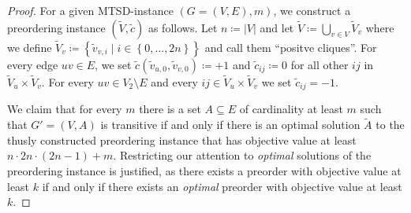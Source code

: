 \begin{proof}
	For a given \textsc{MTSD}-instance $(G=(V,E), m)$, we construct a preordering instance $(\tilde{V}, \tilde{c})$ as follows.
	Let $n \coloneqq \lvert V \rvert$ and let $\tilde{V} \coloneqq \bigcup_{v \in V}^{} \tilde{V}_{v}$ where we define $\tilde{V}_{v} \coloneqq \left\{\tilde{v}_{v,i} \mid i \in \left\{ 0, \ldots, 2n \right\} \right\}$ and call them “positve cliques”.
	For every edge $uv \in E$, we set $\tilde{c}(\tilde{v}_{u,0}, \tilde{v}_{v,0}) \coloneqq +1$ and $\tilde{c}_{ij} \coloneqq 0$ for all other $ij$ in $\tilde{V}_{u} \times \tilde{V}_{v}$.
	For every $uv \in V_{2} \setminus E$ and every $ij \in \tilde{V}_{u} \times \tilde{V}_{v}$ we set $\tilde{c}_{ij} = -1$.

	We claim that for every $m$ there is a set $A \subseteq E$ of cardinality at least $m$ such that $G' = (V, A)$ is transitive
	if and only if there is an optimal solution $\tilde{A}$ to the thusly constructed preordering instance that has objective value at least ${n \cdot 2n \cdot (2n-1)} + m$.
	Restricting our attention to \textit{optimal} solutions of the preordering instance is justified,
	as there exists a preorder with objective value at least $k$ if and only if there exists an \textit{optimal} preorder with objective value at least $k$.


\end{proof}
